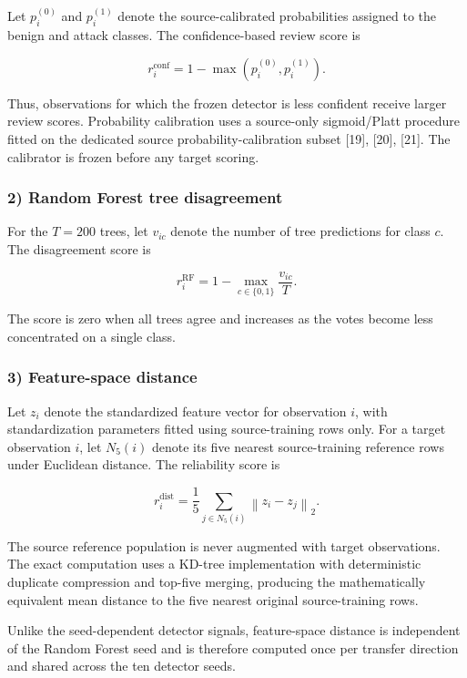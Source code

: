 \documentclass[conference]{IEEEtran}
\begin{document}
Let \(p_i^{(0)}\) and \(p_i^{(1)}\) denote the source-calibrated probabilities assigned to the benign and attack classes. The confidence-based review score is

\[
r_i^{\mathrm{conf}}
=
1-\max\left(p_i^{(0)},p_i^{(1)}\right).
\]

Thus, observations for which the frozen detector is less confident receive larger review scores. Probability calibration uses a source-only sigmoid/Platt procedure fitted on the dedicated source probability-calibration subset [19], [20], [21]. The calibrator is frozen before any target scoring.

\subsubsection{2) Random Forest tree disagreement}

For the \(T=200\) trees, let \(v_{ic}\) denote the number of tree predictions for class \(c\). The disagreement score is

\[
r_i^{\mathrm{RF}}
=
1-\max_{c\in\{0,1\}}\frac{v_{ic}}{T}.
\]

The score is zero when all trees agree and increases as the votes become less concentrated on a single class.

\subsubsection{3) Feature-space distance}

Let \(z_i\) denote the standardized feature vector for observation \(i\), with standardization parameters fitted using source-training rows only. For a target observation \(i\), let \(N_5(i)\) denote its five nearest source-training reference rows under Euclidean distance. The reliability score is

\[
r_i^{\mathrm{dist}}
=
\frac{1}{5}
\sum_{j\in N_5(i)}
\left\lVert z_i-z_j\right\rVert_2 .
\]

The source reference population is never augmented with target observations. The exact computation uses a KD-tree implementation with deterministic duplicate compression and top-five merging, producing the mathematically equivalent mean distance to the five nearest original source-training rows.

Unlike the seed-dependent detector signals, feature-space distance is independent of the Random Forest seed and is therefore computed once per transfer direction and shared across the ten detector seeds.
\end{document}
